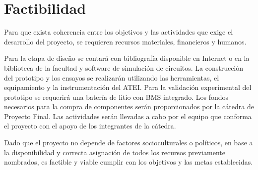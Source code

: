 \section{Factibilidad}

Para que exista coherencia entre los objetivos y las actividades que exige el desarrollo del proyecto,
se requieren recursos materiales, financieros y humanos. 

Para la etapa de diseño se contará con bibliografía disponible en Internet o en la biblioteca de la facultad y software de simulación de circuitos.
La construcción del prototipo y los ensayos se realizarán utilizando las herramientas, el equipamiento y la instrumentación del ATEI. 
Para la validación experimental del prototipo se requerirá una batería de litio con BMS integrado. 
Los fondos necesarios para la compra de componentes serán proporcionados por la cátedra de Proyecto Final.
Las actividades serán llevadas a cabo por el equipo que conforma el proyecto con el apoyo de los integrantes de la cátedra.

Dado que el proyecto no depende de factores socioculturales o políticos, en base a la disponibilidad y correcta asignación
de todos los recursos previamente nombrados, es factible y viable cumplir con los objetivos y las metas establecidas. 
